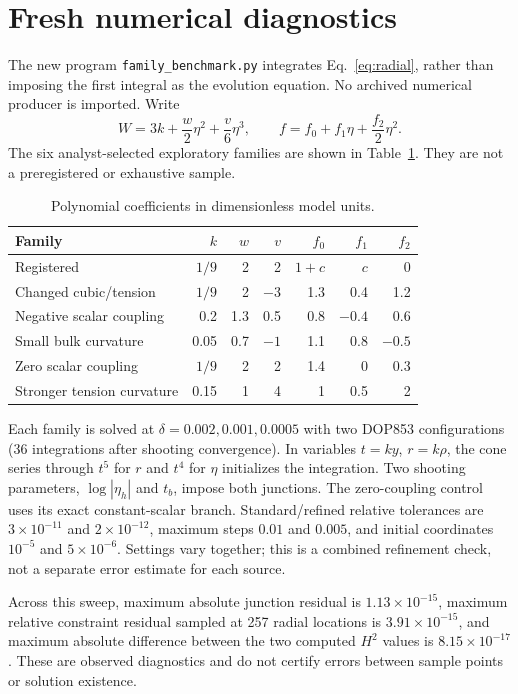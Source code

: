 \documentclass[11pt]{article}
\begin{document}
\section{Fresh numerical diagnostics}
The new program \texttt{family\_benchmark.py} integrates Eq.~\eqref{eq:radial}, rather than imposing the first integral as the evolution equation. No archived numerical producer is imported. Write
\begin{equation}
 W=3k+\frac{w}{2}\eta^2+\frac{v}{6}\eta^3,\qquad
 f=f_0+f_1\eta+\frac{f_2}{2}\eta^2.
\end{equation}
The six analyst-selected exploratory families are shown in Table~\ref{tab:families}. They are not a preregistered or exhaustive sample.
\begin{table}[ht]
\centering\small
\begin{tabular}{lrrrrrr}\toprule
Family & $k$ & $w$ & $v$ & $f_0$ & $f_1$ & $f_2$\\\midrule
Registered & $1/9$ & 2 & 2 & $1+c$ & $c$ & 0\\
Changed cubic/tension & $1/9$ & 2 & $-3$ & 1.3 & 0.4 & 1.2\\
Negative scalar coupling & 0.2 & 1.3 & 0.5 & 0.8 & $-0.4$ & 0.6\\
Small bulk curvature & 0.05 & 0.7 & $-1$ & 1.1 & 0.8 & $-0.5$\\
Zero scalar coupling & $1/9$ & 2 & 2 & 1.4 & 0 & 0.3\\
Stronger tension curvature & 0.15 & 1 & 4 & 1 & 0.5 & 2\\\bottomrule
\end{tabular}
\caption{Polynomial coefficients in dimensionless model units.}\label{tab:families}
\end{table}

Each family is solved at $\delta=0.002,0.001,0.0005$ with two DOP853 configurations (36 integrations after shooting convergence). In variables $t=ky$, $r=k\rho$, the cone series through $t^5$ for $r$ and $t^4$ for $\eta$ initializes the integration. Two shooting parameters, $\log|\eta_h|$ and $t_b$, impose both junctions. The zero-coupling control uses its exact constant-scalar branch. Standard/refined relative tolerances are $3\times10^{-11}$ and $2\times10^{-12}$, maximum steps $0.01$ and $0.005$, and initial coordinates $10^{-5}$ and $5\times10^{-6}$. Settings vary together; this is a combined refinement check, not a separate error estimate for each source.

Across this sweep, maximum absolute junction residual is $1.13\times10^{-15}$, maximum relative constraint residual sampled at 257 radial locations is $3.91\times10^{-15}$, and maximum absolute difference between the two computed $H^2$ values is $8.15\times10^{-17}$. These are observed diagnostics and do not certify errors between sample points or solution existence.
\end{document}

